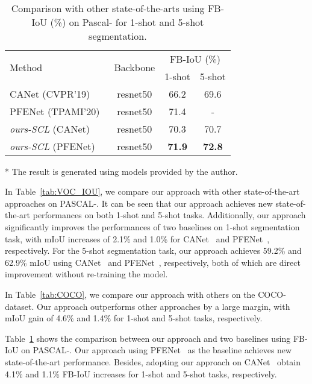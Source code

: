 \documentclass[final]{cvpr}
\begin{document}
\begin{table}[]
	\centering
	\caption{Comparison with other state-of-the-arts using FB-IoU (\%) on Pascal- for 1-shot and 5-shot segmentation. }\label{tab:VOC_FBIOU}\
	\begin{threeparttable}
	\begin{tabular}{lccc}
		\hline
		\multirow{2}{*}{Method} &\multirow{2}{*}{Backbone}& \multicolumn{2}{c}{FB-IoU (\%)} \\ \cline{3-4} 
		&& 1-shot         & 5-shot         \\ \hline
		CANet (CVPR'19)~\cite{zhang2019canet}&resnet50& 66.2 & 69.6\\
		PFENet (TPAMI'20)~\cite{tian2020prior} \tnote{*}&resnet50& 71.4 & - \\ \hline
\emph{ours-SCL }(CANet) &resnet50& 70.3&70.7\\
		\emph{ours-SCL }(PFENet) &resnet50& \textbf{71.9}&\textbf{72.8}\\ \hline
	\end{tabular}
	\begin{tablenotes}
		\item[*] The result is generated using models provided by the author.
	\end{tablenotes}
	\end{threeparttable}
\end{table}

In Table~\ref{tab:VOC_IOU}, we compare our approach with other state-of-the-art approaches on PASCAL-. It can be seen that our approach achieves new state-of-the-art performances on both 1-shot and 5-shot tasks. Additionally, our approach significantly improves the performances of two baselines on 1-shot segmentation task, with mIoU increases of 2.1\% and 1.0\% for CANet~\cite{zhang2019canet} and PFENet~\cite{tian2020prior}, respectively. For the 5-shot segmentation task, our approach achieves 59.2\% and 62.9\% mIoU using CANet~\cite{zhang2019canet} and PFENet~\cite{tian2020prior}, respectively, both of which are direct improvement without re-training the model. 

In Table~\ref{tab:COCO}, we compare our approach with others on the COCO- dataset. Our approach outperforms other approaches by a large margin, with mIoU gain of 4.6\% and 1.4\% for 1-shot and 5-shot tasks, respectively. 

Table~\ref{tab:VOC_FBIOU} shows the comparison between our approach and two baselines using FB-IoU on PASCAL-. Our approach using PFENet~\cite{tian2020prior} as the baseline achieves new state-of-the-art performance. Besides, adopting our approach on CANet~\cite{zhang2019canet} obtain 4.1\% and 1.1\% FB-IoU increases for 1-shot and 5-shot tasks, respectively. 
\end{document}
